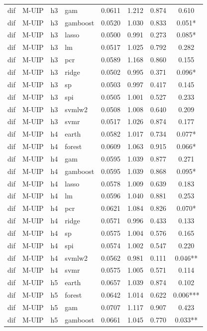 \begin{ThreePartTable}
\begin{longtable}[t]{llclcccc}
dif & M-UIP & h3 & gam & 0.0611 & 1.212 & 0.874 & 0.610\\
dif & M-UIP & h3 & gamboost & 0.0520 & 1.030 & 0.833 & 0.051*\\
dif & M-UIP & h3 & lasso & 0.0500 & 0.991 & 0.273 & 0.085*\\
dif & M-UIP & h3 & lm & 0.0517 & 1.025 & 0.792 & 0.282\\
dif & M-UIP & h3 & pcr & 0.0589 & 1.168 & 0.860 & 0.155\\
dif & M-UIP & h3 & ridge & 0.0502 & 0.995 & 0.371 & 0.096*\\
dif & M-UIP & h3 & sp & 0.0503 & 0.997 & 0.417 & 0.145\\
dif & M-UIP & h3 & spi & 0.0505 & 1.001 & 0.527 & 0.233\\
dif & M-UIP & h3 & svmlw2 & 0.0508 & 1.008 & 0.640 & 0.209\\
dif & M-UIP & h3 & svmr & 0.0517 & 1.026 & 0.874 & 0.177\\
\addlinespace
dif & M-UIP & h4 & earth & 0.0582 & 1.017 & 0.734 & 0.077*\\
dif & M-UIP & h4 & forest & 0.0609 & 1.063 & 0.915 & 0.066*\\
dif & M-UIP & h4 & gam & 0.0595 & 1.039 & 0.877 & 0.271\\
dif & M-UIP & h4 & gamboost & 0.0595 & 1.039 & 0.868 & 0.095*\\
dif & M-UIP & h4 & lasso & 0.0578 & 1.009 & 0.639 & 0.183\\
dif & M-UIP & h4 & lm & 0.0596 & 1.040 & 0.881 & 0.253\\
dif & M-UIP & h4 & pcr & 0.0621 & 1.084 & 0.826 & 0.070*\\
dif & M-UIP & h4 & ridge & 0.0571 & 0.996 & 0.433 & 0.133\\
dif & M-UIP & h4 & sp & 0.0575 & 1.004 & 0.576 & 0.165\\
dif & M-UIP & h4 & spi & 0.0574 & 1.002 & 0.547 & 0.220\\
dif & M-UIP & h4 & svmlw2 & 0.0562 & 0.981 & 0.111 & 0.046**\\
dif & M-UIP & h4 & svmr & 0.0575 & 1.005 & 0.571 & 0.114\\
\addlinespace
dif & M-UIP & h5 & earth & 0.0657 & 1.039 & 0.874 & 0.102\\
dif & M-UIP & h5 & forest & 0.0642 & 1.014 & 0.622 & 0.006***\\
dif & M-UIP & h5 & gam & 0.0707 & 1.117 & 0.907 & 0.423\\
dif & M-UIP & h5 & gamboost & 0.0661 & 1.045 & 0.770 & 0.033**\\

\end{longtable}
\end{ThreePartTable}
